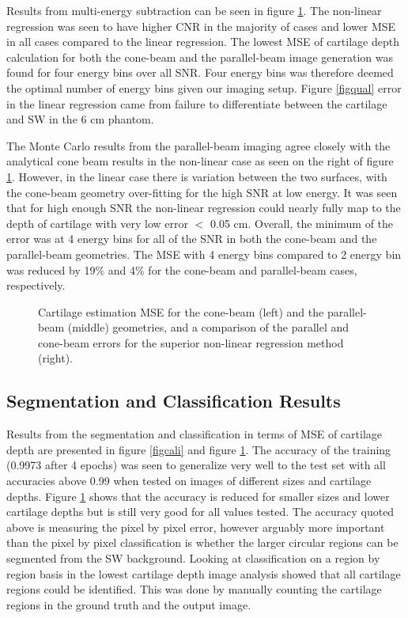 \documentclass[a4paper,11pt]{article}
\begin{document}
Results from multi-energy subtraction can be seen in figure \ref{fig:err}. The non-linear regression was seen to have higher CNR  in the majority of cases and lower MSE in all cases compared to the linear regression. The lowest MSE of cartilage depth calculation for both the cone-beam and the parallel-beam image generation was found for four energy bins over all SNR. Four energy bins was therefore deemed the optimal number of energy bins given our imaging setup. Figure \ref{figqual} error in the linear regression came from failure to differentiate between the cartilage and SW in the 6 cm phantom.

The Monte Carlo results from the parallel-beam imaging agree closely with the analytical cone beam results in the non-linear case as seen on the right of figure \ref{fig:err}. However, in the linear case there is variation between the two surfaces, with the cone-beam geometry over-fitting for the high SNR at low energy. It was seen that for high enough SNR the non-linear regression could nearly fully map to the depth of cartilage with very low error $<$ 0.05 cm. Overall, the minimum of the error was at 4 energy bins for all of the SNR in both the cone-beam and the parallel-beam geometries. The MSE with 4 energy bins compared to 2 energy bin was reduced by 19\% and 4\% for the cone-beam and parallel-beam cases, respectively.

\begin{figure}[htbp]
    \centering
{}
    \caption{Cartilage estimation MSE for the cone-beam (left) and the parallel-beam (middle) geometries, and a comparison of the parallel and cone-beam errors for the superior non-linear regression method (right).}
    \label{fig:err}
\end{figure}

\subsection{Segmentation and Classification Results}

Results from the segmentation and classification in terms of MSE of cartilage depth are presented in figure \ref{figcali} and figure \ref{fig:err}. The accuracy of the training (0.9973 after 4 epochs) was seen to generalize very well to the test set with all accuracies above 0.99 when tested on images of different sizes and cartilage depths. Figure \ref{fig:err} shows that the accuracy is reduced for smaller sizes and lower cartilage depths but is still very good for all values tested. The accuracy quoted above is measuring the pixel by pixel error, however arguably more important than the pixel by pixel classification is whether the larger circular regions can be segmented from the SW background.  Looking at classification on a region by region basis in the lowest cartilage depth image analysis showed that all cartilage regions could be identified. This was done by manually counting the cartilage regions in the ground truth and the output image.
\end{document}
